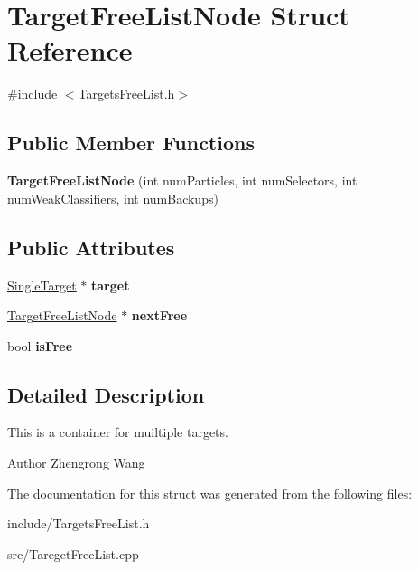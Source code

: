 \hypertarget{structTargetFreeListNode}{}\section{Target\+Free\+List\+Node Struct Reference}
\label{structTargetFreeListNode}


{\ttfamily \#include $<$Targets\+Free\+List.\+h$>$}

\subsection*{Public Member Functions}
\begin{DoxyCompactItemize}
\item 
\hypertarget{structTargetFreeListNode_ae75b1f0cf1c490fd85dcf0e20f7c6e2c}{}{\bfseries Target\+Free\+List\+Node} (int num\+Particles, int num\+Selectors, int num\+Weak\+Classifiers, int num\+Backups)\label{structTargetFreeListNode_ae75b1f0cf1c490fd85dcf0e20f7c6e2c}

\end{DoxyCompactItemize}
\subsection*{Public Attributes}
\begin{DoxyCompactItemize}
\item 
\hypertarget{structTargetFreeListNode_a5c4a07cd700b62863f60b45cb6914b1c}{}\hyperlink{classSingleTarget}{Single\+Target} $\ast$ {\bfseries target}\label{structTargetFreeListNode_a5c4a07cd700b62863f60b45cb6914b1c}

\item 
\hypertarget{structTargetFreeListNode_aed70dee64b2cf879cafc5ad0a8d1025f}{}\hyperlink{structTargetFreeListNode}{Target\+Free\+List\+Node} $\ast$ {\bfseries next\+Free}\label{structTargetFreeListNode_aed70dee64b2cf879cafc5ad0a8d1025f}

\item 
\hypertarget{structTargetFreeListNode_a2100999b22ee0afe1ef11e8abc828f66}{}bool {\bfseries is\+Free}\label{structTargetFreeListNode_a2100999b22ee0afe1ef11e8abc828f66}

\end{DoxyCompactItemize}


\subsection{Detailed Description}
This is a container for muiltiple targets.

\begin{DoxyAuthor}{Author}
Zhengrong Wang 
\end{DoxyAuthor}


The documentation for this struct was generated from the following files\+:\begin{DoxyCompactItemize}
\item 
include/Targets\+Free\+List.\+h\item 
src/Tareget\+Free\+List.\+cpp\end{DoxyCompactItemize}

